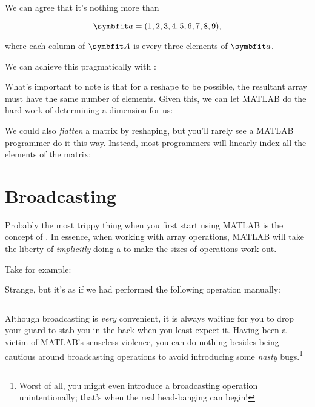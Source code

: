 \documentclass{article}
\begin{document}
We can agree that it's nothing more than

\begin{equation}
	\mat{a}
	=
	(1, 2, 3, 4, 5, 6, 7, 8, 9),
\end{equation}

where each column of \(\mat{A}\) is every three elements of \(\mat{a}\).

\begin{minipage}{\textwidth}
	We can achieve this pragmatically with :

	\vspace{1em}

\end{minipage}

What's important to note is that for a reshape to be possible, the
resultant array must have the same number of elements.  Given this, we
can let MATLAB do the hard work of determining a dimension for us:


We could also \emph{flatten} a matrix by reshaping, but you'll rarely
see a MATLAB programmer do it this way.  Instead, most programmers will
linearly index all the elements of the matrix:


\section{Broadcasting}

Probably the most trippy thing when you first start using MATLAB is the
concept of .  In essence, when working with array
operations, MATLAB will take the liberty of \emph{implicitly} doing a
 to make the sizes of operations work out.

\begin{minipage}{\textwidth}
	Take for example:

	\vspace{1em}

\end{minipage}

Strange, but it's as if we had performed the following operation
manually:

\inputminted{matlab}{02-vectorization.d/broadcast-implicit.m}

Although broadcasting is \emph{very} convenient, it is always waiting
for you to drop your guard to stab you in the back when you least expect
it.  Having been a victim of MATLAB's senseless violence, you can do
nothing besides being cautious around broadcasting operations to avoid
introducing some \emph{nasty} bugs.\footnote{Worst of all, you might
even introduce a broadcasting operation unintentionally; that's when
the real head-banging can begin!}
\end{document}

